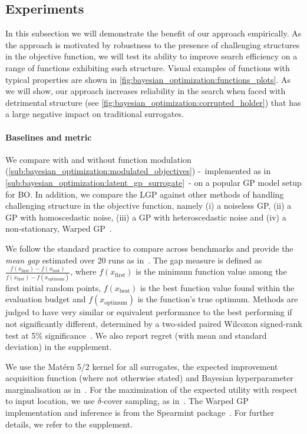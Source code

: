 \subsection{Experiments}

In this subsection we will demonstrate the benefit of our approach empirically.
As the approach is motivated by robustness to the presence of challenging structures in the objective function,
we will test its ability to improve search efficiency on a range of functions exhibiting such structure.
Visual examples of functions with typical properties are shown in \cref{fig:bayesian_optimization:functions_plots}.
As we will show,
our approach increases reliability in the search when faced with detrimental structure (see \cref{fig:bayesian_optimization:corrupted_holder})
that has a large negative impact on traditional surrogates.

\paragraph{Baselines and metric}
We compare with and without function modulation (\cref{sub:bayesian_optimization:modulated_objectives})
-~implemented as in \cref{sub:bayesian_optimization:latent_gp_surrogate}~-
on a popular GP model setup for BO.
In addition, we compare the LGP against other methods of handling challenging structure in the objective function,
namely (i) a noiseless GP,
(ii) a GP with homoscedastic noise,
(iii) a GP with heteroscedastic noise and
(iv) a non-stationary,
Warped GP~\parencite{snoek_input_2014}.

We follow the standard practice to compare across benchmarks and provide the \emph{mean gap} estimated over 20 runs as in~\parencite{malkomes_automating_2018}.
The gap measure is defined as $\frac{f(x_{\text{first}}) - f(x_{\text{best}})}{f(x_{\text{first}}) - f(x_{\text{optimum}})}$,
where $f(x_{\text{first}})$ is the minimum function value among the first initial random points,
$f(x_{\text{best}})$ is the best function value found within the evaluation budget and $f(x_{\text{optimum}})$ is the function's true optimum.
Methods are judged to have very similar or equivalent performance to the best performing if not significantly different,
determined by a two-sided paired Wilcoxon signed-rank test at 5\% significance~\parencite{malkomes_automating_2018}.
We also report regret (with mean and standard deviation) in the supplement.

We use the Mat\'{e}rn 5/2 kernel for all surrogates, the expected improvement acquisition function (where not otherwise stated) and Bayesian hyperparameter marginalisation as in~\parencite{snoek_practical_2012}.
For the maximization of the expected utility with respect to input location,
we use $\delta$-cover sampling, as in~\parencite{de_freitas_exponential_2012}.
The Warped GP implementation and inference is from the Spearmint package~\parencite{snoek_input_2014}.
For further details, we refer to the supplement.

